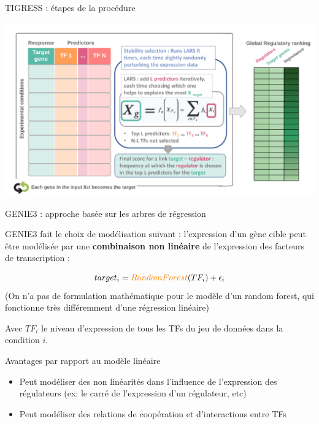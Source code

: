 \begin{frame}{TIGRESS : étapes de la procédure}
\begin{overprint}
	  \includegraphics[scale=0.35]{Figures/Regression/tigress_4-end.pdf}
	 
	\end{overprint}
\end{frame}
	
	










\begin{frame}{GENIE3 : approche basée sur les arbres de régression}

GENIE3 fait le choix de modélisation suivant : l'expression d'un gène cible peut être modélisée par une \textbf{combinaison non linéaire} de l'expression des facteurs de transcription :

    
    \begin{equation*}
    	   target_i = \textcolor{orange}{Random Forest}(TF_i) + \epsilon_i
    \end{equation*}
\scriptsize{(On n'a pas de formulation mathématique pour le modèle d'un random forest, qui fonctionne très différemment d'une régression linéaire)}

\small 
Avec $TF_i$ le niveau d'expression de tous les TFs du jeu de données dans la condition $i$.



\begin{block}{\small Avantages par rapport au modèle linéaire}
\begin{itemize}\scriptsize
    \item Peut modéliser des non linéarités dans l'influence de l'expression des régulateurs (ex: le carré de l'expression d'un régulateur, etc)
    \item Peut modéliser des relations de coopération et d'interactions entre TFs
\end{itemize}
\end{block}

\end{frame}



